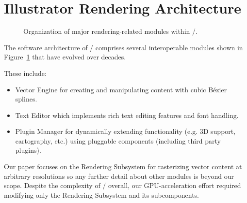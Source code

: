 
\section{Illustrator Rendering Architecture}
\label{sec:background}

\begin{figure}[tb]
  \caption{Organization of major rendering-related modules within \Illustrator/.}
  \label{fig:illustrator-block-diagram}
\end{figure}

The software architecture of \Illustrator/ comprises several interoperable modules shown in
Figure~\ref{fig:illustrator-block-diagram} that have evolved over decades.

\ifdefined\NOSHOW
These include:
\begin{itemize}
\item
Vector Engine for creating and manipulating content with cubic B\'{e}zier splines. 
\item
Text Editor which implements rich text editing features and font handling.
\item
Plugin Manager for dynamically extending functionality (e.g. 3D support, cartography, etc.) using pluggable components (including third party plugins).
\end{itemize}
\fi

Our paper focuses on the Rendering Subsystem
for rasterizing vector content at arbitrary resolutions
so any further detail
about other modules is beyond our scope.  Despite the
complexity of \Illustrator/ overall, our GPU-acceleration effort required modifying
only the Rendering Subsystem and its subcomponents.
	
